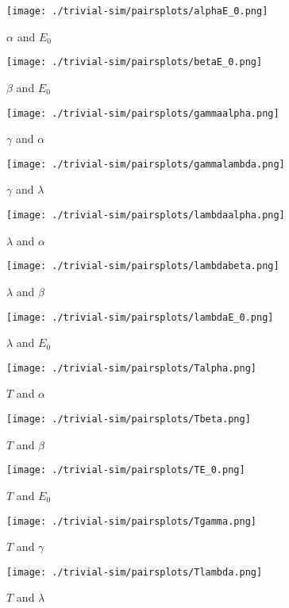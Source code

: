 \documentclass[12pt,letterpaper]{article}
\begin{document}
\begin{figure}
 \centering
\texttt{[image: ./trivial-sim/pairsplots/alphaE\_0.png]}
\caption{$\alpha$ and $E_0$}
\end{figure}

\begin{figure}
 \centering
\texttt{[image: ./trivial-sim/pairsplots/betaE\_0.png]}
\caption{$\beta$ and $E_0$}
\end{figure}

\begin{figure}
 \centering
\texttt{[image: ./trivial-sim/pairsplots/gammaalpha.png]}
\caption{$\gamma$ and $\alpha$}
\end{figure}

\begin{figure}
 \centering
\texttt{[image: ./trivial-sim/pairsplots/gammalambda.png]}
\caption{$\gamma$ and $\lambda$}
\end{figure}

\begin{figure}
 \centering
\texttt{[image: ./trivial-sim/pairsplots/lambdaalpha.png]}
\caption{$\lambda$ and $\alpha$}
\end{figure}
\begin{figure}
 \centering
\texttt{[image: ./trivial-sim/pairsplots/lambdabeta.png]}
\caption{$\lambda$ and $\beta$}
\end{figure}

\begin{figure}
 \centering
\texttt{[image: ./trivial-sim/pairsplots/lambdaE\_0.png]}
\caption{$\lambda$ and $E_0$}
\end{figure}
\begin{figure}
 \centering
\texttt{[image: ./trivial-sim/pairsplots/Talpha.png]}
\caption{$T$ and $\alpha$}
\end{figure}
\begin{figure}
 \centering
\texttt{[image: ./trivial-sim/pairsplots/Tbeta.png]}
\caption{$T$ and $\beta$}
\end{figure}
\newpage
\begin{figure}
 \centering
\texttt{[image: ./trivial-sim/pairsplots/TE\_0.png]}
\caption{$T$ and $E_0$}
\end{figure}

\begin{figure}
 \centering
\texttt{[image: ./trivial-sim/pairsplots/Tgamma.png]}
\caption{$T$ and $\gamma$}
\end{figure}
\begin{figure}
 \centering
\texttt{[image: ./trivial-sim/pairsplots/Tlambda.png]}
\caption{$T$ and $\lambda$}
\end{figure}
\end{document}
